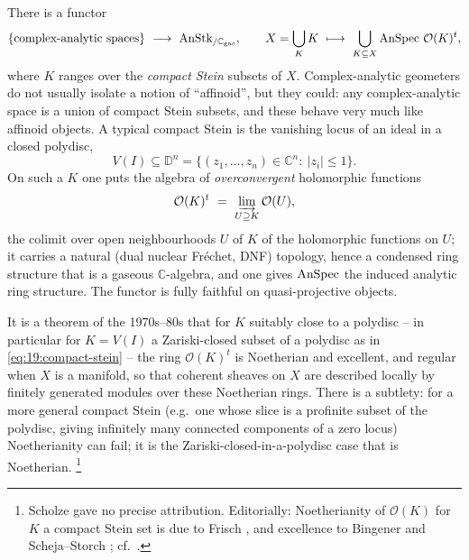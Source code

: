 \begin{example}
\label{ex:19:complex-analytic}
There is a functor
\begin{equation*}
\{\text{complex-analytic spaces}\}\ \longrightarrow\ \AnStk_{/\mathbb C_{\mathrm{gas}}},
\qquad
X=\bigcup_K K\ \longmapsto\ \bigcup_{K\subseteq X}\AnSpec\,\mathcal O(K)^{t},
\end{equation*}
where $K$ ranges over the \emph{compact Stein} subsets of $X$. Complex-analytic
geometers do not usually isolate a notion of ``affinoid'', but they could: any
complex-analytic space is a union of compact Stein subsets, and these behave very
much like affinoid objects. A typical compact Stein is the vanishing locus of an
ideal in a closed polydisc,
\begin{equation}
\label{eq:19:compact-stein}
V(I)\subseteq\mathbb D^n=\{(z_1,\dots,z_n)\in\mathbb C^n:\ |z_i|\le1\}.
\end{equation}
On such a $K$ one puts the algebra of \emph{overconvergent} holomorphic functions
\begin{equation}
\label{eq:19:overconvergent}
\mathcal O(K)^{t}\ =\ \varinjlim_{U\supseteq K}\mathcal O(U),
\end{equation}
the colimit over open neighbourhoods $U$ of $K$ of the holomorphic functions on
$U$; it carries a natural (dual nuclear Fréchet, DNF) topology, hence a condensed
ring structure that is a gaseous $\mathbb C$-algebra, and one gives $\operatorname{AnSpec}$ the
induced analytic ring structure. The functor is fully faithful on quasi-projective
objects.
\end{example}

\begin{remark}
\label{rmk:19:stein-noetherian}
It is a theorem of the 1970s--80s that for $K$ suitably close to a polydisc --
in particular for $K=V(I)$ a Zariski-closed subset of a polydisc as in
\eqref{eq:19:compact-stein} -- the ring $\mathcal O(K)^t$ is Noetherian and
excellent, and regular when $X$ is a manifold, so that coherent sheaves on $X$ are
described locally by finitely generated modules over these Noetherian rings.
There is a subtlety: for a more general compact Stein (e.g.\ one whose slice is a
profinite subset of the polydisc, giving infinitely many connected components of a
zero locus) Noetherianity can fail; it is the Zariski-closed-in-a-polydisc case
that is Noetherian.%
\footnote{Scholze gave no precise attribution. Editorially: Noetherianity of
$\mathcal O(K)$ for $K$ a compact Stein set is due to Frisch
\cite{Frisch_1967}, and excellence to Bingener \cite{Bingener_1978} and
Scheja--Storch \cite{Scheja_1972}; cf.\ 
\cite[Appendix to Lecture X]{clausen2022complex}.}
\end{remark}

